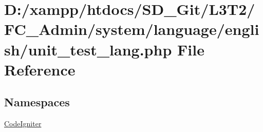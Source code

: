 \hypertarget{unit__test__lang_8php}{}\section{D\+:/xampp/htdocs/\+S\+D\+\_\+\+Git/\+L3\+T2/\+F\+C\+\_\+\+Admin/system/language/english/unit\+\_\+test\+\_\+lang.php File Reference}
\label{unit__test__lang_8php}
\subsection*{Namespaces}
\begin{DoxyCompactItemize}
\item 
 \hyperlink{namespace_code_igniter}{Code\+Igniter}
\end{DoxyCompactItemize}
